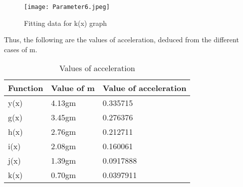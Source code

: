 \documentclass[12pt, letterpaper]{article}
\begin{document}
\begin{figure}[!ht]
    \centering
    \texttt{[image: Parameter6.jpeg]}
    \caption{Fitting data for k(x) graph}
    \label{fig:fig8}
\end{figure}

\vspace{8cm}

Thus, the following are the values of acceleration, deduced from the different cases of m.

\begin{table}[h]
    \centering 
    \caption{Values of acceleration}
    \begin{tabu}{*{3}{X[C]}}
         \toprule
         \textbf{Function} & {Value of m} & {Value of acceleration} \\
         \midrule
         y(x) & 4.13gm & 0.335715  \\
         g(x) & 3.45gm & 0.276376 \\
         h(x) & 2.76gm & 0.212711 \\
         i(x) & 2.08gm & 0.160061 \\
         j(x) & 1.39gm & 0.0917888 \\
         k(x) & 0.70gm & 0.0397911 \\
         \bottomrule
    \end{tabu}
    \label{tab:Acceleration for constant mass case}
\end{table}
\hline
\end{document}
